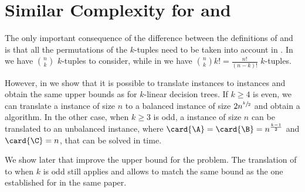 \section{Similar Complexity for \kSUM and \kLDT}

The only important consequence of the difference between the definitions of
\kSUM and \kLDT is that all the permutations of the $k$-tuples need to be taken
into account in \kLDT. In \kSUM we have $\binom{n}{k}$ $k$-tuples to consider,
while in \kLDT we have $\binom{n}{k} k! = \frac{n!}{(n-k)!}$ $k$-tuples.

However, in  we show that it is possible to translate
\kLDT instances to
\kSUM instances and obtain the same upper bounds as \kSUM for $k$-linear
decision trees. If $k \ge 4$ is even, we can translate a \kLDT instance of
size \(n\) to a balanced \twoSUM instance of size \(2n^{\sfrac{k}{2}}\)
and obtain a  algorithm. In the other case, when
$k \ge 3$ is odd, a \kLDT instance of size \(n\) can be translated to an unbalanced \threeSUM instance, where
\(\card{\A} = \card{\B} = n^{\frac{k-1}{2}}\) and \(\card{\C} = n\), that can be solved in
 time.

We show later that \citet*{gronlund:2014} improve the upper bound for the
\threeSUM problem. The translation of \kLDT to \threeSUM when $k$ is
odd still applies
and allows to match the same 
bound as the one established for \threeSUM in the same paper.

